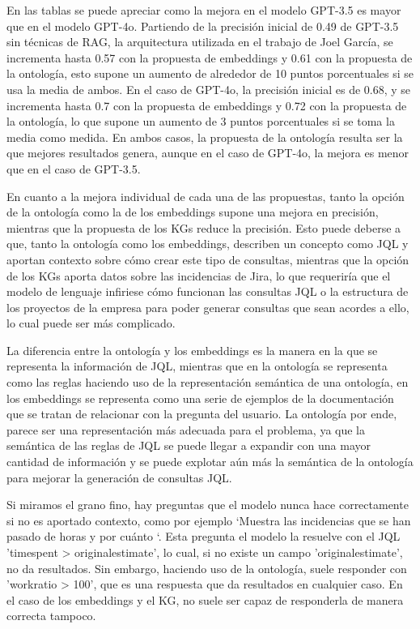 En las tablas se puede apreciar como la mejora en el modelo GPT-3.5 es mayor que en el modelo GPT-4o. Partiendo de la precisión inicial de 0.49 de GPT-3.5 sin técnicas de RAG, la arquitectura utilizada en el trabajo de Joel García, se incrementa hasta 0.57 con la propuesta de embeddings y 0.61 con la propuesta de la ontología, esto supone un aumento de alrededor de 10 puntos porcentuales si se usa la media de ambos. En el caso de GPT-4o, la precisión inicial es de 0.68, y se incrementa hasta 0.7 con la propuesta de embeddings y 0.72 con la propuesta de la ontología, lo que supone un aumento de 3 puntos porcentuales si se toma la media como medida. En ambos casos, la propuesta de la ontología resulta ser la que mejores resultados genera, aunque en el caso de GPT-4o, la mejora es menor que en el caso de GPT-3.5.

En cuanto a la mejora individual de cada una de las propuestas, tanto la opción de la ontología como la de los embeddings supone una mejora en precisión, mientras que la propuesta de los KGs reduce la precisión. Esto puede deberse a que, tanto la ontología como los embeddings, describen un concepto como JQL y aportan contexto sobre cómo crear este tipo de consultas, mientras que la opción de los KGs aporta datos sobre las incidencias de Jira, lo que requeriría que el modelo de lenguaje infiriese cómo funcionan las consultas JQL o la estructura de los proyectos de la empresa para poder generar consultas que sean acordes a ello, lo cual puede ser más complicado.

La diferencia entre la ontología y los embeddings es la manera en la que se representa la información de JQL, mientras que en la ontología se representa como las reglas haciendo uso de la representación semántica de una ontología, en los embeddings se representa como una serie de ejemplos de la documentación que se tratan de relacionar con la pregunta del usuario. La ontología por ende, parece ser una representación más adecuada para el problema, ya que la semántica de las reglas de JQL se puede llegar a expandir con una mayor cantidad de información y se puede explotar aún más la semántica de la ontología para mejorar la generación de consultas JQL.

Si miramos el grano fino, hay preguntas que el modelo nunca hace correctamente si no es aportado contexto, como por ejemplo `Muestra las incidencias que se han pasado de horas y por cuánto `. Esta pregunta el modelo la resuelve con el JQL 'timespent > originalestimate', lo cual, si no existe un campo 'originalestimate', no da resultados. Sin embargo, haciendo uso de la ontología, suele responder con 'workratio > 100', que es una respuesta que da resultados en cualquier caso. En el caso de los embeddings y el KG, no suele ser capaz de responderla de manera correcta tampoco.

